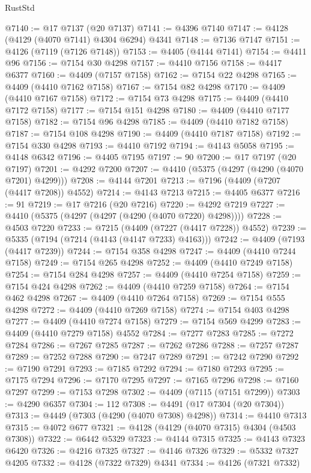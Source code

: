 \begin{lexlean}{RustStd}
\begin{coremodule}
@7140 := @17 @7137 (@20 @7137)
@7141 := @4396 @7140
@7147 := @4128 (@4129 (@4070 @7141) @4304 @6294) @4341
@7148 := @7136 @7147
@7151 := @4126 (@7119 (@7126 @7148))
@7153 := @4405 (@4144 @7141)
@7154 := @4411 @96
@7156 := @7154 @30 @4298
@7157 := @4410 @7156
@7158 := @4417 @6377
@7160 := @4409 (@7157 @7158)
@7162 := @7154 @22 @4298
@7165 := @4409 (@4410 @7162 @7158)
@7167 := @7154 @82 @4298
@7170 := @4409 (@4410 @7167 @7158)
@7172 := @7154 @73 @4298
@7175 := @4409 (@4410 @7172 @7158)
@7177 := @7154 @151 @4298
@7180 := @4409 (@4410 @7177 @7158)
@7182 := @7154 @96 @4298
@7185 := @4409 (@4410 @7182 @7158)
@7187 := @7154 @108 @4298
@7190 := @4409 (@4410 @7187 @7158)
@7192 := @7154 @330 @4298
@7193 := @4410 @7192
@7194 := @4143 @5058
@7195 := @4148 @6342
@7196 := @4405 @7195
@7197 := 90
@7200 := @17 @7197 (@20 @7197)
@7201 := @4292 @7200
@7207 := @4410 (@5375 (@4297 (@4290 (@4070 @7201) @4299)))
@7208 := @4144 @7201
@7213 := @7196 (@4409 (@7207 (@4417 @7208)) @4552)
@7214 := @4143 @7213
@7215 := @4405 @6377
@7216 := 91
@7219 := @17 @7216 (@20 @7216)
@7220 := @4292 @7219
@7227 := @4410 (@5375 (@4297 (@4297 (@4290 (@4070 @7220) @4298))))
@7228 := @4503 @7220
@7233 := @7215 (@4409 (@7227 (@4417 @7228)) @4552)
@7239 := @5335 (@7194 (@7214 (@4143 (@4147 @7233) @4163)))
@7242 := @4409 (@7193 (@4417 @7239))
@7244 := @7154 @358 @4298
@7247 := @4409 (@4410 @7244 @7158)
@7249 := @7154 @265 @4298
@7252 := @4409 (@4410 @7249 @7158)
@7254 := @7154 @284 @4298
@7257 := @4409 (@4410 @7254 @7158)
@7259 := @7154 @424 @4298
@7262 := @4409 (@4410 @7259 @7158)
@7264 := @7154 @462 @4298
@7267 := @4409 (@4410 @7264 @7158)
@7269 := @7154 @555 @4298
@7272 := @4409 (@4410 @7269 @7158)
@7274 := @7154 @403 @4298
@7277 := @4409 (@4410 @7274 @7158)
@7279 := @7154 @569 @4299
@7283 := @4409 (@4410 @7279 @7158) @4552
@7284 := @7277 @7283
@7285 := @7272 @7284
@7286 := @7267 @7285
@7287 := @7262 @7286
@7288 := @7257 @7287
@7289 := @7252 @7288
@7290 := @7247 @7289
@7291 := @7242 @7290
@7292 := @7190 @7291
@7293 := @7185 @7292
@7294 := @7180 @7293
@7295 := @7175 @7294
@7296 := @7170 @7295
@7297 := @7165 @7296
@7298 := @7160 @7297
@7299 := @7153 @7298
@7302 := @4409 (@7115 (@7151 @7299))
@7303 := @4290 @6357
@7304 := 112
@7308 := @4491 (@17 @7304 (@20 @7304))
@7313 := @4449 (@7303 (@4290 (@4070 @7308) @4298))
@7314 := @4410 @7313
@7315 := @4072 @677
@7321 := @4128 (@4129 (@4070 @7315) @4304 (@4503 @7308))
@7322 := @6442 @5329
@7323 := @4144 @7315
@7325 := @4143 @7323 @6420
@7326 := @4216 @7325
@7327 := @4146 @7326
@7329 := @5332 @7327 @4205
@7332 := @4128 (@7322 @7329) @4341
@7334 := @4126 (@7321 @7332)

\end{coremodule}
\end{lexlean}
